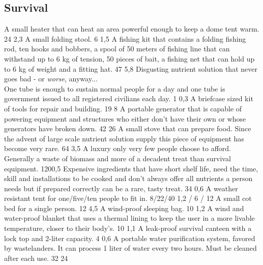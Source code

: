 \subsection{Survival}
\vspace{10mm}
\begin{multicols}{2}
    {A small heater that can heat an area powerful enough to keep a dome tent warm.}
    {24}
    {2,3}
    {A small folding stool.}
    {6}
    {1,5}
    {A fishing kit that contains
        a folding fishing rod,
        ten hooks and bobbers,
        a spool of 50 meters of fishing line
        that can withstand up to 6 kg of tension,
        50 pieces of bait,
        a fishing net that can hold up to 6 kg of weight
        and a fitting hat.}
    {47}
    {5,8}
    {Disgusting nutrient solution that never goes bad
        - or \textit{worse}, anyway... \\
        One tube is enough to sustain normal people for a day
        and one tube is government issued to all registered civilians each day.}
    {1}
    {0,3}
    {A briefcase sized kit of tools for repair and building.}
    {19}
    {8}
    {A portable generator that is capable of
        powering equipment and structures
        who either don't have their own or whose generators have broken down.}
    {42}
    {26}
    {A small stove that can prepare food.
        Since the advent of large scale nutrient solution supply
        this piece of equipment has become very rare.}
    {64}
    {3,5}
    {A luxury only very few people choose to afford.
        Generally a waste of biomass
        and more of a decadent treat than survival equipment.}
    {120}{0,5}
    {Expensive ingredients that have short shelf life,
        need the time, skill and installations to be cooked
        and don't always offer all nutrients a person needs
        but if prepared correctly can be a rare, tasty treat.}
    {34}
    {0,6}
    {A weather resistant tent for one/five/ten people to fit in.}
    {8/22/40}
    {1,2 / 6 / 12}
    {A small cot bed for a single person.}
    {12}
    {4,5}
    {A wind-proof sleeping bag.}
    {10}
    {1,2}
    {A wind and water-proof blanket that uses a thermal lining
        to keep the user in a more livable temperature,
        closer to their body's.}
    {10}
    {1,1}
    {A leak-proof survival canteen with a lock top and 2-liter capacity.}
    {4}
    {0,6}
    {A portable water purification system, favored by wastelanders.
        It can process 1 liter of water every two hours.
        Must be cleaned after each use.}
    {32}
    {24}
\end{multicols}

